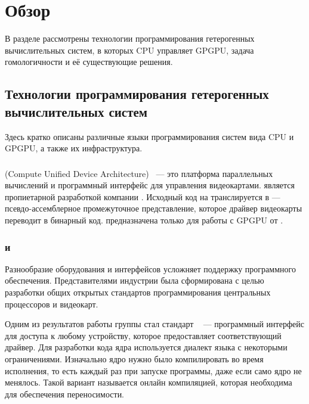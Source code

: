 \section{Обзор}
В разделе рассмотрены технологии программирования 
гетерогенных вычислительных систем, в которых CPU управляет GPGPU,
задача гомологичности и её существующие решения.

\subsection[Технологии программирования гетерогенных систем] {Технологии программирования гетерогенных\\вычислительных систем}
Здесь кратко описаны различные языки программирования систем вида 
CPU и GPGPU, а также их инфраструктура.

\subsubsection{}
 (Compute Unified Device Architecture)~\cite{CUDA} --- 
это платформа параллельных вычислений и программный интерфейс 
для управления видеокартами.
 является пропиетарной разработкой компании .
Исходный код на  транслируется в  ---
псевдо-ассемблерное промежуточное представление, 
которое драйвер видеокарты переводит в бинарный код.
 предназначена только для работы с GPGPU от .

\subsubsection{ и }
Разнообразие оборудования и интерфейсов усложняет поддержку
программного обеспечения.
Представителями индустрии была сформирована  с целью
разработки общих открытых стандартов программирования центральных процессоров 
и видеокарт.

Одним из результатов работы группы стал стандарт 
~\cite{OpenCL} --- программный интерфейс для доступа к любому
устройству, которое предоставляет соответствующий драйвер.
Для разработки кода ядра используется диалект
языка  с некоторыми ограничениями.
Изначально ядро нужно было компилировать во время исполнения, 
то есть каждый раз при запуске программы, даже если само ядро не менялось.
Такой вариант называется онлайн компиляцией, которая необходима для 
обеспечения переносимости.

